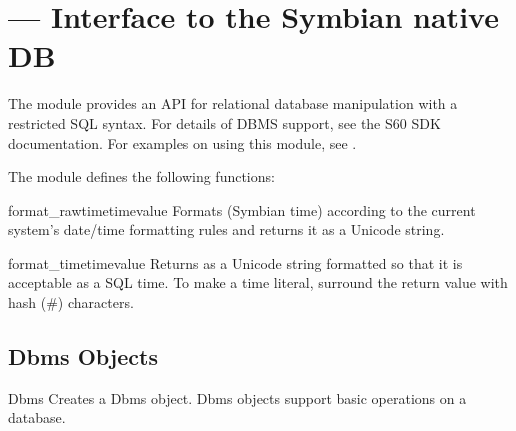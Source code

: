 %
%
%

\section{ ---
  Interface to the Symbian native DB}
\label{sec:e32db}


\label{sec:mylabel3}
The  module provides an API for relational database 
manipulation with a restricted SQL syntax. For details of DBMS support, see 
the S60 SDK documentation. For examples on using this module, see \cite{PyS60Prog}.

The  module defines the following functions:

\begin{funcdesc}{format_rawtime}{timevalue}
Formats  (Symbian time) according to the current 
system's date/time formatting rules and returns it as a Unicode string.
\end{funcdesc}

\begin{funcdesc}{format_time}{timevalue}
Returns  as a Unicode string formatted so that it is
acceptable as a SQL time. To make a time literal, surround the return
value with hash (\#) characters.
\end{funcdesc}

\subsection{Dbms Objects}
\label{subsec:mylabel13}

\begin{classdesc}{Dbms}{}
Creates a Dbms object. Dbms objects support basic 
operations on a database. 
\end{classdesc}

